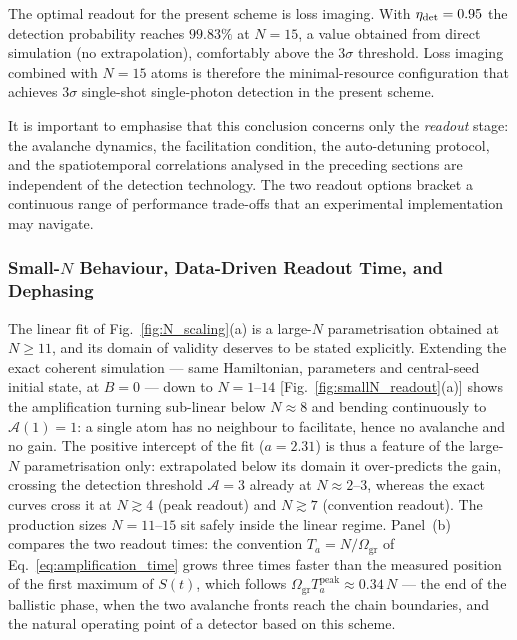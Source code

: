 The optimal readout for the present scheme is loss imaging. With $\eta_{\rm det} = 0.95$ the detection probability reaches $99.83\%$ at $N = 15$, a value obtained from direct simulation (no extrapolation), comfortably above the $3\sigma$ threshold. Loss imaging combined with $N = 15$ atoms is therefore the minimal-resource configuration that achieves $3\sigma$ single-shot single-photon detection in the present scheme.

It is important to emphasise that this conclusion concerns only the \emph{readout} stage: the avalanche dynamics, the facilitation condition, the auto-detuning protocol, and the spatiotemporal correlations analysed in the preceding sections are independent of the detection technology. The two readout options bracket a continuous range of performance trade-offs that an experimental implementation may navigate.

\subsubsection{Small-$N$ Behaviour, Data-Driven Readout Time, and Dephasing}
\label{sec:smallN_readout}

The linear fit of Fig.~\ref{fig:N_scaling}(a) is a large-$N$ parametrisation obtained at $N \geq 11$, and its domain of validity deserves to be stated explicitly. Extending the exact coherent simulation --- same Hamiltonian, parameters and central-seed initial state, at $B=0$ --- down to $N = 1$--$14$ [Fig.~\ref{fig:smallN_readout}(a)] shows the amplification turning sub-linear below $N \approx 8$ and bending continuously to $\mathcal{A}(1) = 1$: a single atom has no neighbour to facilitate, hence no avalanche and no gain. The positive intercept of the fit ($a = 2.31$) is thus a feature of the large-$N$ parametrisation only: extrapolated below its domain it over-predicts the gain, crossing the detection threshold $\mathcal{A}=3$ already at $N \approx 2$--$3$, whereas the exact curves cross it at $N \gtrsim 4$ (peak readout) and $N \gtrsim 7$ (convention readout). The production sizes $N = 11$--$15$ sit safely inside the linear regime. Panel~(b) compares the two readout times: the convention $T_a = N/\Omega_{\mathrm{gr}}$ of Eq.~\eqref{eq:amplification_time} grows three times faster than the measured position of the first maximum of $S(t)$, which follows $\Omega_{\mathrm{gr}} T_a^{\mathrm{peak}} \approx 0.34\,N$ --- the end of the ballistic phase, when the two avalanche fronts reach the chain boundaries, and the natural operating point of a detector based on this scheme.

